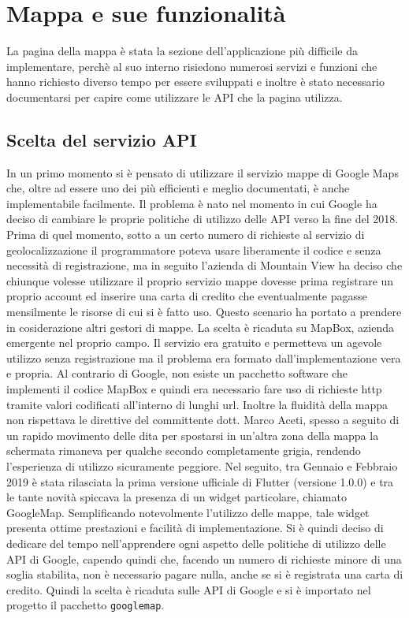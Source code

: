 \section{Mappa e sue funzionalità}
La pagina della mappa è stata la sezione dell'applicazione più difficile da
implementare, perchè al suo interno risiedono numerosi servizi e funzioni che
hanno richiesto diverso tempo per essere sviluppati e inoltre è stato necessario
documentarsi per capire come utilizzare le API che la pagina utilizza.

\subsection{Scelta del servizio API}
In un primo momento si è pensato di utilizzare il servizio mappe di Google Maps
che, oltre ad essere uno dei più efficienti e meglio documentati, è anche
implementabile facilmente. Il problema è nato nel momento in cui Google ha
deciso di cambiare le proprie politiche di utilizzo delle API verso la fine del
2018. Prima di quel momento, sotto a un certo numero di richieste al servizio di
geolocalizzazione il programmatore poteva usare liberamente il codice e senza
necessità di registrazione, ma in seguito l'azienda di Mountain View ha deciso
che chiunque volesse utilizzare il proprio servizio mappe dovesse prima
registrare un proprio account ed inserire una carta di credito che eventualmente
pagasse mensilmente le risorse di cui si è fatto uso. Questo scenario ha portato
a prendere in cosiderazione altri gestori di mappe. La scelta è ricaduta su
MapBox, azienda emergente nel proprio campo. Il servizio era gratuito e permetteva
un agevole utilizzo senza registrazione ma il problema era formato
dall'implementazione vera e propria. Al contrario di Google, non esiste un
pacchetto software che implementi il codice MapBox e quindi era necessario fare
uso di richieste http tramite valori codificati all'interno di lunghi url.
Inoltre la fluidità della mappa non rispettava le direttive del committente
dott. Marco Aceti, spesso a seguito di un rapido movimento delle dita per
spostarsi in un'altra zona della mappa la schermata rimaneva per qualche secondo
completamente grigia, rendendo l'esperienza di utilizzo sicuramente peggiore.
Nel seguito, tra Gennaio e Febbraio 2019 è stata rilasciata la prima versione
ufficiale di Flutter (versione 1.0.0) e tra le tante novità spiccava la presenza
di un widget particolare, chiamato GoogleMap. Semplificando notevolmente
l'utilizzo delle mappe, tale widget presenta ottime prestazioni e facilità di
implementazione. Si è quindi deciso di dedicare del tempo nell'apprendere ogni
aspetto delle politiche di utilizzo delle API di Google, capendo quindi che,
facendo un numero di richieste minore di una soglia stabilita, non è necessario
pagare nulla, anche se si è registrata una carta di credito. Quindi la scelta è
ricaduta sulle API di Google e si è importato nel progetto il pacchetto
\verb|googlemap|.

